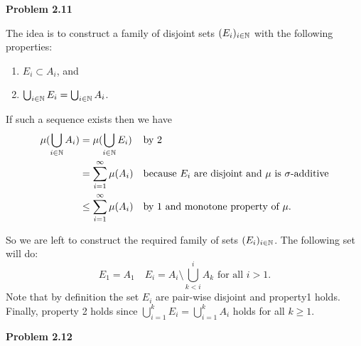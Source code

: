 \bigskip 

\textbf{Problem 2.11}

The idea is to construct a family of disjoint sets $(E_i)_{i \in \mathbb N}$ with the following properties:
\begin{enumerate}
\item $E_i \subset A_i$, and
\item $\bigcup_{i \in \mathbb N} E_i = \bigcup_{i \in \mathbb N} A_i$.
\end{enumerate}

If such a sequence exists then we have
\begin{align*}
	\mu(\bigcup_{i \in \mathbb N} A_i) &= \mu(\bigcup_{i \in \mathbb N} E_i) &&\text{by 2}\\
	&= \sum_{i = 1}^\infty \mu(A_i) &&\text{because $E_i$ are disjoint and $\mu$ is $\sigma$-additive}\\
	&\le \sum_{i = 1}^\infty \mu(A_i) &&\text{by 1 and monotone property of $\mu$}.
\end{align*}

So we are left to construct the required family of sets $(E_i)_{i \in \mathbb N}$. The following set will do:
\[
	E_1 = A_1 \quad E_i = A_i \setminus \bigcup_{k < i}^i A_k \text{ for all } i > 1.
\]
Note that by definition the set $E_i$ are pair-wise disjoint and property1 holds. Finally, property 2 holds since $\bigcup_{i = 1}^k E_i = \bigcup_{i = 1}^k A_i$ holds for all $k \ge 1$.

\bigskip

\textbf{Problem 2.12}

